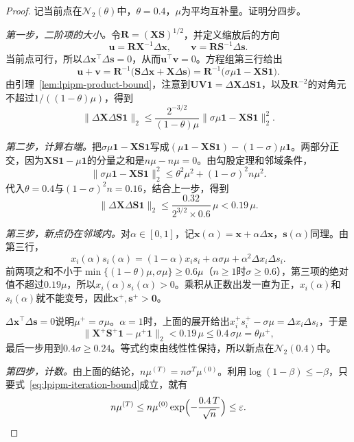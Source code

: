 \begin{proof}
记当前点在$\mathcal{N}_2(\theta)$中，$\theta=0.4$，$\mu$为平均互补量。证明分四步。

\emph{第一步，二阶项的大小。}令$\bm{R}=(\bm{X}\bm{S})^{1/2}$，并定义缩放后的方向
\[
 \bm{u}=\bm{R}\bm{X}^{-1}\Delta\bm{x},\qquad\bm{v}=\bm{R}\bm{S}^{-1}\Delta\bm{s}.
\]
当前点可行，所以$\Delta\bm{x}^\top\Delta\bm{s}=0$，从而$\bm{u}^\top\bm{v}=0$。方程组第三行给出
\[
 \bm{u}+\bm{v}=\bm{R}^{-1}\bigl(\bm{S}\Delta\bm{x}+\bm{X}\Delta\bm{s}\bigr)=\bm{R}^{-1}\bigl(\sigma\mu\bm{1}-\bm{X}\bm{S}\bm{1}\bigr).
\]
由引理~\ref{lem:lpipm-product-bound}，注意到$\bm{U}\bm{V}\bm{1}=\Delta\bm{X}\Delta\bm{S}\bm{1}$，以及$\bm{R}^{-2}$的对角元不超过$1/((1-\theta)\mu)$，得到
\[
 \lVert\Delta\bm{X}\Delta\bm{S}\bm{1}\rVert_2\leq\frac{2^{-3/2}}{(1-\theta)\mu}\lVert\sigma\mu\bm{1}-\bm{X}\bm{S}\bm{1}\rVert_2^2.
\]

\emph{第二步，计算右端。}把$\sigma\mu\bm{1}-\bm{X}\bm{S}\bm{1}$写成$(\mu\bm{1}-\bm{X}\bm{S}\bm{1})-(1-\sigma)\mu\bm{1}$。两部分正交，因为$\bm{X}\bm{S}\bm{1}-\mu\bm{1}$的分量之和是$n\mu-n\mu=0$。由勾股定理和邻域条件，
\[
 \lVert\sigma\mu\bm{1}-\bm{X}\bm{S}\bm{1}\rVert_2^2\leq\theta^2\mu^2+(1-\sigma)^2n\mu^2.
\]
代入$\theta=0.4$与$(1-\sigma)^2n=0.16$，结合上一步，得到
\[
 \lVert\Delta\bm{X}\Delta\bm{S}\bm{1}\rVert_2\leq\frac{0.32}{2^{3/2}\times0.6}\,\mu<0.19\,\mu.
\]

\emph{第三步，新点仍在邻域内。}对$\alpha\in[0,1]$，记$\bm{x}(\alpha)=\bm{x}+\alpha\Delta\bm{x}$，$\bm{s}(\alpha)$同理。由第三行，
\[
 x_i(\alpha)s_i(\alpha)=(1-\alpha)x_is_i+\alpha\sigma\mu+\alpha^2\Delta x_i\Delta s_i.
\]
前两项之和不小于$\min\{(1-\theta)\mu,\sigma\mu\}\geq0.6\mu$（$n\geq1$时$\sigma\geq0.6$），第三项的绝对值不超过$0.19\mu$，所以$x_i(\alpha)s_i(\alpha)>0$。乘积从正数出发一直为正，$x_i(\alpha)$和$s_i(\alpha)$就不能变号，因此$\bm{x}^+,\bm{s}^+>\bm{0}$。

$\Delta\bm{x}^\top\Delta\bm{s}=0$说明$\mu^+=\sigma\mu$。$\alpha=1$时，上面的展开给出$x_i^+s_i^+-\sigma\mu=\Delta x_i\Delta s_i$，于是
\[
 \lVert\bm{X}^+\bm{S}^+\bm{1}-\mu^+\bm{1}\rVert_2<0.19\,\mu\leq0.4\,\sigma\mu=\theta\mu^+,
\]
最后一步用到$0.4\sigma\geq0.24$。等式约束由线性性保持，所以新点在$\mathcal{N}_2(0.4)$中。

\emph{第四步，计数。}由上面的结论，$n\mu^{(T)}=n\sigma^T\mu^{(0)}$。利用$\log(1-\beta)\leq-\beta$，只要式~\eqref{eq:lpipm-iteration-bound}成立，就有
\[
 n\mu^{(T)}\leq n\mu^{(0)}\exp\Bigl(-\frac{0.4\,T}{\sqrt{n}}\Bigr)\leq\varepsilon.\qedhere
\]
\end{proof}

